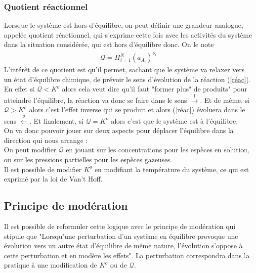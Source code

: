 \documentclass[12pt,prb,aps,epsf]{report}
\begin{document}
\subsubsection{Quotient réactionnel}
Lorsque le système est hors d'équilibre, on peut définir une grandeur analogue, appelée quotient réactionnel, qui s'exprime cette fois avec les activités du système dans la situation considérée, qui est hors d'équilibre donc. On le note 
\begin{eqnarray}
\mathcal{Q} = \Pi_{i=1}^N (a_{A_i})^{\overline{\nu_i}}
\end{eqnarray}
L'intérêt de ce quotient est qu'il permet, sachant que le système va relaxer vers un état d'équilibre chimique, de prévoir le sens d'évolution de la réaction (\ref{réac}). En effet si $\mathcal{Q}<K^{o}$ alors cela veut dire qu'il faut "former plus" de produits" pour atteindre l'équilibre, la réaction va donc se faire dans le sens $\stackrel{1}\longrightarrow$. Et de même, si $\mathcal{Q}>K^{o}$ alors c'est l'effet inverse qui se produit et alors (\ref{réac}) évoluera dans le sens $\stackrel{2}\longleftarrow$. Et finalement, si $\mathcal{Q} = K^{o}$ alors c'est que le système est à l'équilibre.\\ 
On va donc pouvoir jouer sur deux aspects pour déplacer l'équilibre dans la direction qui nous arrange :\\

On peut modifier $\mathcal{Q}$ en jouant sur les concentrations pour les espèces en solution, ou sur les pressions partielles pour les espèces gazeuses.\\

Il est possible de modifier $K^o$ en modifiant la température du système, ce qui est exprimé par la loi de Van't Hoff.

\subsection{Principe de modération}
Il est possible de reformuler cette logique avec le principe de modération qui stipule que "Lorsqu'une perturbation d'un système en équilibre provoque une évolution vers un autre état d'équilibre de même nature, l'évolution s'oppose à cette perturbation et en modère les effets". La perturbation correspondra dans la pratique à une modification de $K^o$ ou de $\mathcal{Q}$.
\end{document}
